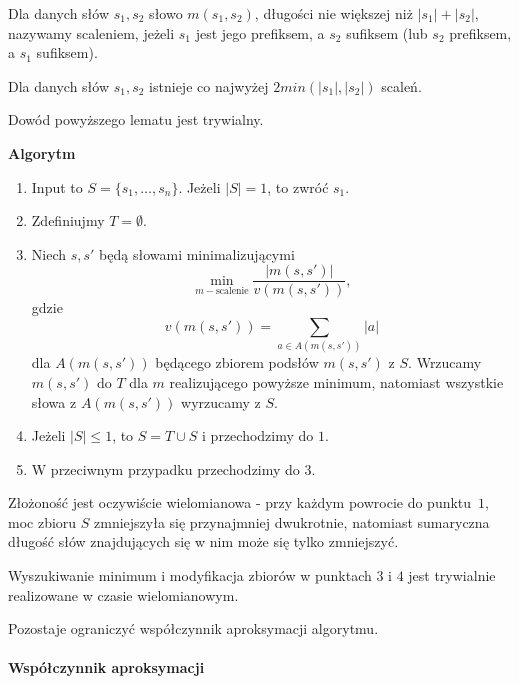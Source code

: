 \begin{definition}{}{}
Dla danych słów $s_1, s_2$ słowo $m(s_1, s_2)$, długości nie większej niż $|s_1| + |s_2|$, nazywamy scaleniem, jeżeli $s_1$ jest jego prefiksem, a $s_2$ sufiksem (lub $s_2$ prefiksem, a $s_1$ sufiksem).
\end{definition}

\begin{lemma}{}{}
Dla danych słów $s_1, s_2$ istnieje co najwyżej $2 min(|s_1|, |s_2|)$ scaleń.
\end{lemma}

Dowód powyższego lematu jest trywialny.

\textbf{Algorytm}
\begin{enumerate}
    \item Input to $S = \{s_1, \dots, s_n\}$. Jeżeli $|S| = 1$, to zwróć $s_1$.
    \item Zdefiniujmy $T = \emptyset$.
    \item Niech $s, s'$ będą słowami minimalizującymi 
    $$\min_{m - \text{scalenie}} \frac{|m(s, s')|}{v(m(s, s'))},$$
    gdzie 
    $$v(m(s, s')) = \sum_{a\in A(m(s,s'))} |a|$$ 
    dla $A(m(s,s'))$ będącego zbiorem podsłów $m(s,s')$ z $S$. Wrzucamy $m(s, s')$ do $T$ dla $m$ realizującego powyższe minimum, natomiast wszystkie słowa z $A(m(s,s'))$ wyrzucamy z $S$.
    \item Jeżeli $|S| \leq 1$, to $S = T \cup S$ i przechodzimy do $1$.
    \item W przeciwnym przypadku przechodzimy do $3$.
\end{enumerate}

Złożoność jest oczywiście wielomianowa - przy każdym powrocie do punktu~$1$, moc zbioru $S$ zmniejszyła się przynajmniej dwukrotnie, natomiast sumaryczna długość słów znajdujących się w nim może się tylko zmniejszyć.

Wyszukiwanie minimum i modyfikacja zbiorów w punktach $3$ i $4$ jest trywialnie realizowane w czasie wielomianowym.

Pozostaje ograniczyć współczynnik aproksymacji algorytmu.

\paragraph{Współczynnik aproksymacji}


